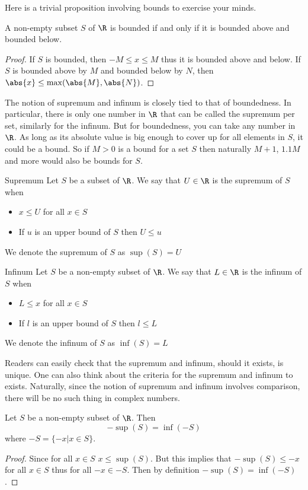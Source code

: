 Here is a trivial proposition involving bounds to exercise your minds. 

\begin{prp}{}{} A non-empty subset $S$ of $\R$ is bounded if and only if it is bounded above and bounded below. \tcbline
\begin{proof} If $S$ is bounded, then $-M\leq x\leq M$ thus it is bounded above and below. If $S$ is bounded above by $M$ and bounded below by $N$, then $\abs{x}\leq\max(\abs{M},\abs{N})$. 
\end{proof}
\end{prp}

The notion of supremum and infinum is closely tied to that of boundedness. In particular, there is only one number in $\R$ that can be called the supremum per set, similarly for the infinum. But for boundedness, you can take any number in $\R$. As long as its absolute value is big enough to cover up for all elements in $S$, it could be a bound. So if $M>0$ is a bound for a set $S$ then naturally $M+1$, $1.1M$ and more would also be bounds for $S$. 

\begin{defn}{Supremum}{} Let $S$ be a subset of $\R$. We say that $U\in\R$ is the supremum of $S$ when
\begin{itemize}
\item $x\leq U$ for all $x\in S$
\item If $u$ is an upper bound of $S$ then $U\leq u$
\end{itemize}
We denote the supremum of $S$ as $\sup(S)=U$
\end{defn}

\begin{defn}{Infinum}{} Let $S$ be a non-empty subset of $\R$. We say that $L\in\R$ is the infinum of $S$ when
\begin{itemize}
\item $L\leq x$ for all $x\in S$
\item If $l$ is an upper bound of $S$ then $l\leq L$
\end{itemize}
We denote the infinum of $S$ as $\inf(S)=L$
\end{defn}

Readers can easily check that the supremum and infinum, should it exists, is unique. One can also think about the criteria for the supremum and infinum to exists. Naturally, since the notion of supremum and infinum involves comparison, there will be no such thing in complex numbers. 

\begin{thm}{}{} Let $S$ be a non-empty subset of $\R$. Then $$-\sup(S)=\inf(-S)$$ where $-S=\{-x|x\in S\}$. \tcbline
\begin{proof} Since for all $x\in S$ $x\leq\sup(S)$. But this implies that $-\sup(S)\leq-x$ for all $x\in S$ thus for all $-x\in-S$. Then by definition $-\sup(S)=\inf(-S)$. 
\end{proof}
\end{thm}

